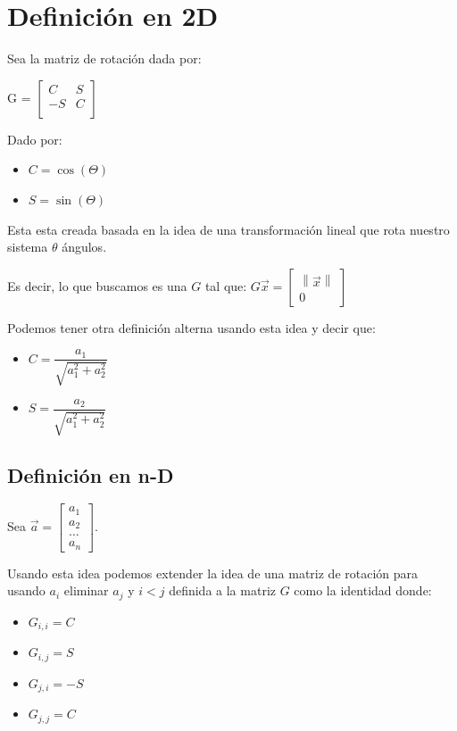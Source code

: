 \documentclass[12pt, fleqn]{report}                             %
\def \Eq {equation}                                             %
\newenvironment{MultiLineEquation*}[1]                          %
        {\begin{\Eq*}\begin{alignedat}{#1}}                         %
        {\end{alignedat}\end{\Eq*}}                                 %
\theoremstyle{break}                                            %
\newcommand{\Wrap}[1]           {\left( #1 \right)}             %
\newcommand{\Abs}[1]    {\left\lVert #1 \right\lVert}           %
\newcommand{\bVector}[1]                                        %
        { \ensuremath{\begin{bmatrix}#1\end{bmatrix}} }             %
\newcommand{\Cos}[1] {\cos\Wrap{#1}}                            %
\newcommand{\Sin}[1] {\sin\Wrap{#1}}                            %
\begin{document}
        \section{Definición en 2D}

            Sea la matriz de rotación dada por:
            \begin{MultiLineEquation*}{3}
                G = \bVector{
                    C  & S \\
                    -S & C \\
                }
            \end{MultiLineEquation*}
            
            Dado por:
            \begin{itemize}
                \item $C = \Cos{\Theta}$
                \item $S = \Sin{\Theta}$
            \end{itemize}


            Esta esta creada basada en la idea de una transformación lineal
            que rota nuestro sistema $\theta$ ángulos.

            Es decir, lo que buscamos es una $G$ tal que:
            $G \vec x = \bVector{\Abs{\vec x} \\ 0}$

            Podemos tener otra definición alterna usando esta idea
            y decir que:
            \begin{itemize}
                \item $C = \dfrac{a_1}{\sqrt{a_1^2 + a_2^2}}$
                \item $S = \dfrac{a_2}{\sqrt{a_1^2 + a_2^2}}$
            \end{itemize}

            \clearpage
            \subsection{Definición en n-D}


                Sea $\vec a = \bVector{a_1 \\ a_2 \\ \dots \\ a_n}$.

                Usando esta idea podemos extender la idea de una matriz
                de rotación para usando $a_i$ eliminar $a_j$ y $i < j$ definida
                a la matriz $G$ como la identidad donde:
                \begin{itemize}
                    \item $G_{i, i} =  C$
                    \item $G_{i, j} =  S$
                    \item $G_{j, i} = -S$
                    \item $G_{j, j} =  C$
                \end{itemize}
\end{document}
